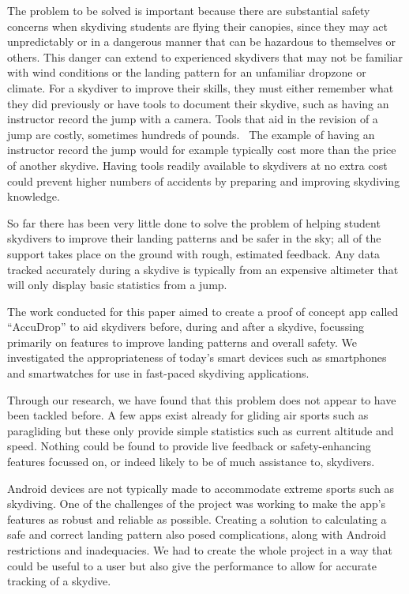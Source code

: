 The problem to be solved is important because there are substantial safety concerns when skydiving students are flying their canopies, since they may act unpredictably or in a dangerous manner that can be hazardous to themselves or others. This danger can extend to experienced skydivers that may not be familiar with wind conditions or the landing pattern for an unfamiliar dropzone or climate.
For a skydiver to improve their skills, they must either remember what they did previously or have tools to document their skydive, such as having an instructor record the jump with a camera. Tools that aid in the revision of a jump are costly, sometimes hundreds of pounds.~\cite{dekunu_dekunu_????} The example of having an instructor record the jump would for example typically cost more than the price of another skydive.
Having tools readily available to skydivers at no extra cost could prevent higher numbers of accidents by preparing and improving skydiving knowledge.

So far there has been very little done to solve the problem of helping student skydivers to improve their landing patterns and be safer in the sky; all of the support takes place on the ground with rough, estimated feedback. Any data tracked accurately during a skydive is typically from an expensive altimeter that will only display basic statistics from a jump.

The work conducted for this paper aimed to create a proof of concept app called ``AccuDrop'' to aid skydivers before, during and after a skydive, focussing primarily on features to improve landing patterns and overall safety. We investigated the appropriateness of today's smart devices such as smartphones and smartwatches for use in fast-paced skydiving applications.

Through our research, we have found that this problem does not appear to have been tackled before. A few apps exist already for gliding air sports such as paragliding but these only provide simple statistics such as current altitude and speed. Nothing could be found to provide live feedback or safety-enhancing features focussed on, or indeed likely to be of much assistance to, skydivers.

Android devices are not typically made to accommodate extreme sports such as skydiving. One of the challenges of the project was working to make the app's features as robust and reliable as possible. Creating a solution to calculating a safe and correct landing pattern also posed complications, along with Android restrictions and inadequacies. We had to create the whole project in a way that could be useful to a user but also give the performance to allow for accurate tracking of a skydive.
